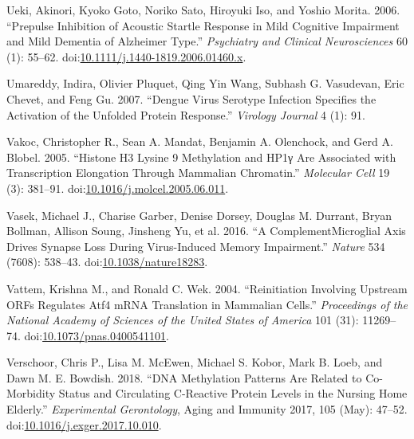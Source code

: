 \documentclass[onehalf,12pt]{beavtex}
\begin{document}
  \hypertarget{ref-UekiPrepulseinhibitionacoustic2006}{}
  Ueki, Akinori, Kyoko Goto, Noriko Sato, Hiroyuki Iso, and Yoshio Morita.
  2006. ``Prepulse Inhibition of Acoustic Startle Response in Mild
  Cognitive Impairment and Mild Dementia of Alzheimer Type.''
  \emph{Psychiatry and Clinical Neurosciences} 60 (1): 55--62.
  doi:\href{https://doi.org/10.1111/j.1440-1819.2006.01460.x}{10.1111/j.1440-1819.2006.01460.x}.
  
  \hypertarget{ref-UmareddyDenguevirusserotype2007}{}
  Umareddy, Indira, Olivier Pluquet, Qing Yin Wang, Subhash G. Vasudevan,
  Eric Chevet, and Feng Gu. 2007. ``Dengue Virus Serotype Infection
  Specifies the Activation of the Unfolded Protein Response.''
  \emph{Virology Journal} 4 (1): 91.
  
  \hypertarget{ref-VakocHistoneH3Lysine2005}{}
  Vakoc, Christopher R., Sean A. Mandat, Benjamin A. Olenchock, and Gerd
  A. Blobel. 2005. ``Histone H3 Lysine 9 Methylation and HP1γ Are
  Associated with Transcription Elongation Through Mammalian Chromatin.''
  \emph{Molecular Cell} 19 (3): 381--91.
  doi:\href{https://doi.org/10.1016/j.molcel.2005.06.011}{10.1016/j.molcel.2005.06.011}.
  
  \hypertarget{ref-Vasekcomplementmicroglialaxis2016}{}
  Vasek, Michael J., Charise Garber, Denise Dorsey, Douglas M. Durrant,
  Bryan Bollman, Allison Soung, Jinsheng Yu, et al. 2016. ``A
  ComplementMicroglial Axis Drives Synapse Loss During Virus-Induced
  Memory Impairment.'' \emph{Nature} 534 (7608): 538--43.
  doi:\href{https://doi.org/10.1038/nature18283}{10.1038/nature18283}.
  
  \hypertarget{ref-VattemReinitiationinvolvingupstream2004}{}
  Vattem, Krishna M., and Ronald C. Wek. 2004. ``Reinitiation Involving
  Upstream ORFs Regulates Atf4 mRNA Translation in Mammalian Cells.''
  \emph{Proceedings of the National Academy of Sciences of the United
  States of America} 101 (31): 11269--74.
  doi:\href{https://doi.org/10.1073/pnas.0400541101}{10.1073/pnas.0400541101}.
  
  \hypertarget{ref-VerschoorDNAmethylationpatterns2018}{}
  Verschoor, Chris P., Lisa M. McEwen, Michael S. Kobor, Mark B. Loeb, and
  Dawn M. E. Bowdish. 2018. ``DNA Methylation Patterns Are Related to
  Co-Morbidity Status and Circulating C-Reactive Protein Levels in the
  Nursing Home Elderly.'' \emph{Experimental Gerontology}, Aging and
  Immunity 2017, 105 (May): 47--52.
  doi:\href{https://doi.org/10.1016/j.exger.2017.10.010}{10.1016/j.exger.2017.10.010}.
  
\end{document}
